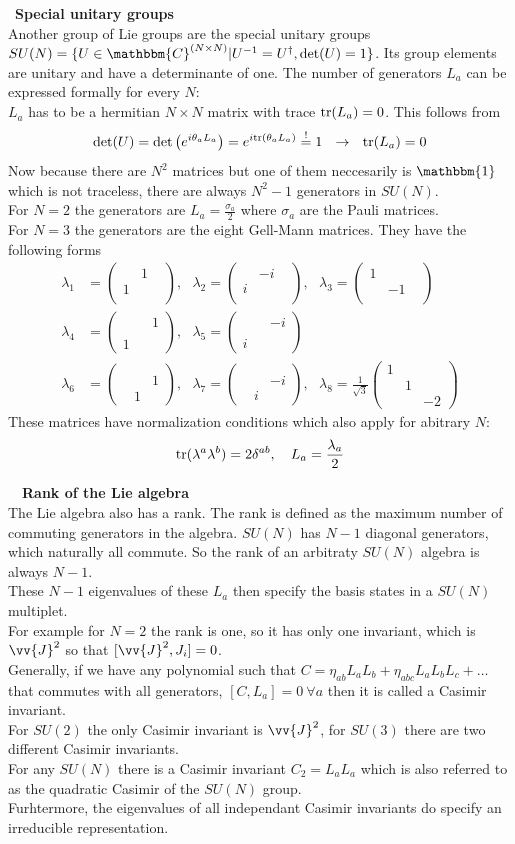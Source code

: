 \documentclass{include/thesisclass}
\newcommand{\df}{\rightarrow}
\newcommand{\ehm}{\mathbbm{1}}
\newcommand{\soll}{\overset{!}{=}}
\newcommand{\Mat}[9]{\begin{pmatrix}#1&#2&#3\\#4&#5&#6\\#7&#8&#9\end{pmatrix}}
\newcommand{\sub}[1]{~\newline\newline\textbf{#1}\\}
\newcommand{\tr}{{\rm tr}}
\begin{document}
\sub{Special unitary groups}
Another group of Lie groups are the special unitary groups $SU(N) = \{ U \in\mathbbm{C}^{(N\times N)} | U^{-1} = U^\dagger, \det(U) = 1\}$. Its group elements are unitary and have a determinante of one. The number of generators $L_a$ can be expressed formally for every $N$:\\
$L_a$ has to be a hermitian $N\times N$ matrix with trace $\tr(L_a) = 0$. This follows from
\[ \det(U) = \det \left( e^{i \theta_a L_a}\right) = e^{i \tr(\theta_a L_a)} \soll 1 ~~\df ~~ \tr(L_a) = 0\]
Now because there are $N^2$ matrices but one of them neccesarily is $\ehm$ which is not traceless, there are always $N^2-1$ generators in $SU(N)$.\\
For $N = 2$ the generators are $L_a = \frac{\sigma_a}{2}$ where $\sigma_a$ are the Pauli matrices.\\
For $N = 3$ the generators are the eight Gell-Mann matrices. They have the following forms
\begin{align*} \lambda_1 &= \Mat{}{1}{}{1}{}{}{}{}{},~~~\lambda_2 = \Mat{}{-i}{}{i}{}{}{}{}{},~~~\lambda_3 = \Mat{1}{}{}{}{-1}{}{}{}{}\\
\lambda_4 &= \Mat{}{}{1}{}{}{}{1}{}{}, ~~~\lambda_5 = \Mat{}{}{-i}{}{}{}{i}{}{}\\
\lambda_6 &= \Mat{}{}{}{}{}{1}{}{1}{}, ~~~\lambda_7 = \Mat{}{}{}{}{}{-i}{}{i}{}, ~~~\lambda_8 = \frac{1}{\sqrt{3}} \Mat{1}{}{}{}{1}{}{}{}{-2}
\end{align*}
These matrices have normalization conditions which also apply for abitrary $N$:
\[ \tr(\lambda^a \lambda^b) = 2\delta^{ab}, ~~~ L_a = \frac{\lambda_a}{2}\]


~\newline\newline\sub{Rank of the Lie algebra}
The Lie algebra also has a rank. The rank is defined as the maximum number of commuting generators in the algebra. $SU(N)$ has $N-1$ diagonal generators, which naturally all commute. So the rank of an arbitraty $SU(N)$ algebra is always $N-1$.\\
These $N-1$ eigenvalues of these $L_a$ then specify the basis states in a $SU(N)$ multiplet.\\
For example for $N = 2$ the rank is one, so it has only one invariant, which is $\vv{J}^2$ so that $[\vv{J}^2, J_i] = 0$.\\
Generally, if we have any polynomial such that $C = \eta_{ab} L_a L_b + \eta_{abc} L_aL_bL_c + \ldots$ that commutes with all generators, $[C,L_a] = 0 ~\forall a$ then it is called a Casimir invariant.\\
For $SU(2)$ the only Casimir invariant is $\vv{J}^2$, for $SU(3)$ there are two different Casimir invariants.\\
For any $SU(N)$ there is a Casimir invariant $C_2 = L_aL_a$ which is also referred to as the quadratic Casimir of the $SU(N)$ group.\\
Furhtermore, the eigenvalues of all independant Casimir invariants do specify an irreducible representation.
\end{document}
